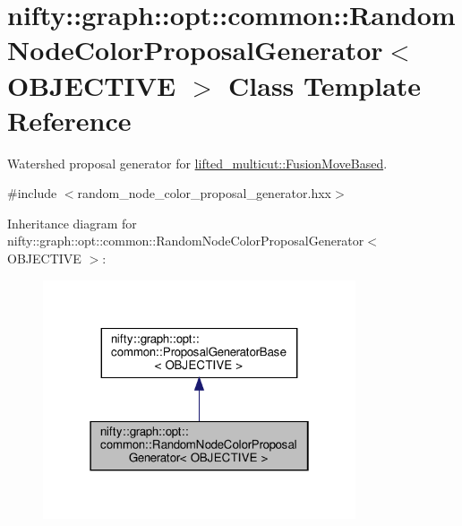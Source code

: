 \hypertarget{classnifty_1_1graph_1_1opt_1_1common_1_1RandomNodeColorProposalGenerator}{}\section{nifty\+:\+:graph\+:\+:opt\+:\+:common\+:\+:Random\+Node\+Color\+Proposal\+Generator$<$ O\+B\+J\+E\+C\+T\+I\+VE $>$ Class Template Reference}
\label{classnifty_1_1graph_1_1opt_1_1common_1_1RandomNodeColorProposalGenerator}


Watershed proposal generator for \hyperlink{classnifty_1_1graph_1_1opt_1_1lifted__multicut_1_1FusionMoveBased}{lifted\+\_\+multicut\+::\+Fusion\+Move\+Based}.  




{\ttfamily \#include $<$random\+\_\+node\+\_\+color\+\_\+proposal\+\_\+generator.\+hxx$>$}



Inheritance diagram for nifty\+:\+:graph\+:\+:opt\+:\+:common\+:\+:Random\+Node\+Color\+Proposal\+Generator$<$ O\+B\+J\+E\+C\+T\+I\+VE $>$\+:
\nopagebreak
\begin{figure}[H]
\begin{center}
\leavevmode
\includegraphics[width=262pt]{classnifty_1_1graph_1_1opt_1_1common_1_1RandomNodeColorProposalGenerator__inherit__graph}
\end{center}
\end{figure}


